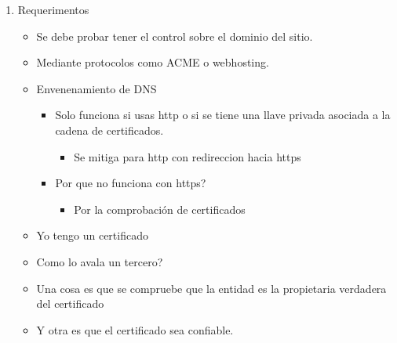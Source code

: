\documentclass[11pt]{article}
\begin{document}
\begin{enumerate}
\item Requerimentos
\label{sec:org76b8fd9}
\begin{itemize}
\item Se debe probar tener el control sobre el dominio del sitio.
\item Mediante protocolos como ACME o webhosting.

\item Envenenamiento de DNS
\begin{itemize}
\item Solo funciona si usas http o si se tiene una llave privada asociada a la cadena de certificados.
\begin{itemize}
\item Se mitiga para http con redireccion hacia https
\end{itemize}
\item Por que no funciona con https?
\begin{itemize}
\item Por la comprobación de certificados
\end{itemize}
\end{itemize}

\item Yo tengo un certificado
\item Como lo avala un tercero?
\item Una cosa es que se compruebe que la entidad es la propietaria verdadera del certificado
\item Y otra es que el certificado sea confiable.
\end{itemize}
\end{enumerate}
\end{document}
